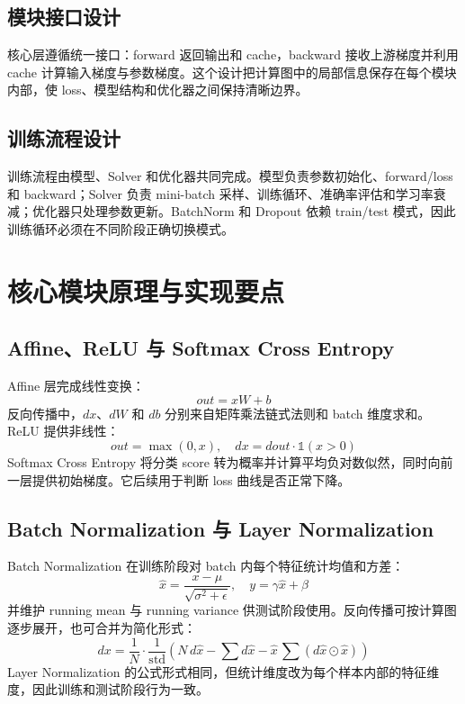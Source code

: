 \documentclass[UTF8]{ctexart}
\begin{document}
\subsection{模块接口设计}

核心层遵循统一接口：forward 返回输出和 cache，backward 接收上游梯度并利用 cache 计算输入梯度与参数梯度。这个设计把计算图中的局部信息保存在每个模块内部，使 loss、模型结构和优化器之间保持清晰边界。

\subsection{训练流程设计}

训练流程由模型、Solver 和优化器共同完成。模型负责参数初始化、forward/loss 和 backward；Solver 负责 mini-batch 采样、训练循环、准确率评估和学习率衰减；优化器只处理参数更新。BatchNorm 和 Dropout 依赖 train/test 模式，因此训练循环必须在不同阶段正确切换模式。

\section{核心模块原理与实现要点}

\subsection{Affine、ReLU 与 Softmax Cross Entropy}

Affine 层完成线性变换：
\[
out = xW + b
\]
反向传播中，$dx$、$dW$ 和 $db$ 分别来自矩阵乘法链式法则和 batch 维度求和。ReLU 提供非线性：
\[
out = \max(0, x), \quad dx = dout \cdot \mathbb{1}(x > 0)
\]
Softmax Cross Entropy 将分类 score 转为概率并计算平均负对数似然，同时向前一层提供初始梯度。它后续用于判断 loss 曲线是否正常下降。

\subsection{Batch Normalization 与 Layer Normalization}

Batch Normalization 在训练阶段对 batch 内每个特征统计均值和方差：
\[
\hat{x} = \frac{x-\mu}{\sqrt{\sigma^2+\epsilon}}, \quad y = \gamma \hat{x} + \beta
\]
并维护 running mean 与 running variance 供测试阶段使用。反向传播可按计算图逐步展开，也可合并为简化形式：
\[
dx =
\frac{1}{N}
\cdot
\frac{1}{\mathrm{std}}
\left(
N\,d\hat{x}
-
\sum d\hat{x}
-
\hat{x}\,\sum(d\hat{x}\odot\hat{x})
\right)
\]
Layer Normalization 的公式形式相同，但统计维度改为每个样本内部的特征维度，因此训练和测试阶段行为一致。
\end{document}
